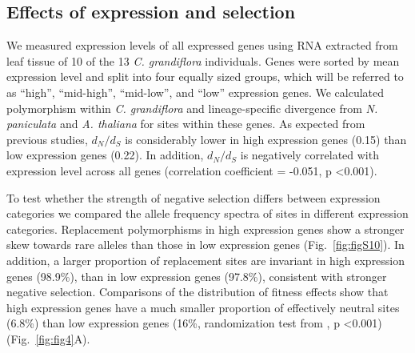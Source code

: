 \subsection{Effects of expression and selection}
We measured expression levels of all expressed genes using RNA extracted from leaf tissue of 10 of the 13 \textit{C. grandiflora} individuals. Genes were sorted by mean expression level and split into four equally sized groups, which will be referred to as “high”, “mid-high”, “mid-low”, and “low” expression genes. We calculated polymorphism within \textit{C. grandiflora} and lineage-specific divergence from \textit{N. paniculata} and \textit{A. thaliana} for sites within these genes. As expected from previous studies, $d_{N}/d_{S}$ is considerably lower in high expression genes (0.15) than low expression genes (0.22).  In addition, $d_{N}/d_{S}$ is negatively correlated with expression level across all genes (correlation coefficient = -0.051, p \textless 0.001).

To test whether the strength of negative selection differs between expression categories we compared the allele frequency spectra of sites in different expression categories. Replacement polymorphisms in high expression genes show a stronger skew towards rare alleles than those in low expression genes (Fig.~\ref{fig:figS10}). In addition, a larger proportion of replacement sites are invariant in high expression genes (98.9\%), than in low expression genes (97.8\%), consistent with stronger negative selection. Comparisons of the distribution of fitness effects show that high expression genes have a much smaller proportion of effectively neutral sites (6.8\%) than low expression genes (16\%, randomization test from \citet{Eyre-Walker2009-zt}, p \textless  0.001) (Fig.~\ref{fig:fig4}A).  

